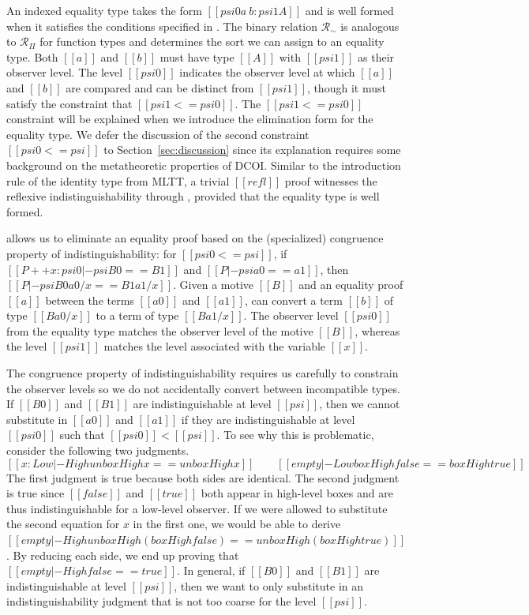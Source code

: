 \documentclass[acmsmall]{acmart}
\newcommand{\name}{DCOI\xspace}
\begin{document}
An indexed equality type takes the
form $[[psi0 a ~ b : psi1 A]]$ and is well formed when it satisfies
the conditions specified in . The binary relation
$\mathcal{R}_\sim$ is analogous to $\mathcal{R}_\Pi$ for function
types and determines the sort we can assign to an equality type.
Both $[[a]]$ and $[[b]]$
must have type $[[A]]$ with $[[psi1]]$ as their observer
level. 
The level $[[psi0]]$ indicates the observer level at which
$[[a]]$ and $[[b]]$ are compared and can be distinct from
$[[psi1]]$, though it must satisfy the constraint that $[[psi1 <=
psi0]]$. The $[[psi1 <= psi0]]$ constraint will be explained
when we introduce the elimination form for the equality type.
We defer the discussion of the second constraint $[[psi0 <=
psi]]$ to Section~\ref{sec:discussion} since its explanation requires
some background on the metatheoretic properties of \name{}.
Similar to the introduction rule of the identity type
from MLTT, a trivial $[[refl]]$ proof witnesses the reflexive
indistinguishability through , provided that the equality type is well formed.

 allows us to eliminate an equality proof based on the
(specialized) congruence property of indistinguishability:
for $[[psi0 <= psi]]$, if $[[P ++ x : psi0 |- psi B0 == B1]]$ and $[[P |-
psi a0 == a1]]$, then $[[P |- psi B0 {a0 / x} == B1 {a1 / x}]]$.
Given a motive
$[[B]]$ %
and an equality proof $[[a]]$
between the terms $[[a0]]$ and $[[a1]]$,  can convert a
term $[[b]]$ of type $[[B {a0 / x}]]$ to a term of type $[[B {a1 /
  x}]]$. The observer level $[[psi0]]$ from the equality type matches
the observer level
of the motive $[[B]]$, whereas the level $[[psi1]]$ matches the
level associated with the variable $[[x]]$.

The congruence property of indistinguishability
requires us carefully to constrain the observer levels so we do not
accidentally convert between incompatible types. If $[[B0]]$ and
$[[B1]]$ are indistinguishable at level $[[psi]]$, then we cannot
substitute in $[[a0]]$ and $[[a1]]$ if they are indistinguishable at
level $[[psi0]]$ such that $[[psi0]] < [[psi]]$. To see why this is
problematic, consider the following two judgments.
\[ [[x : Low  |- High unbox High x == unbox High x ]] \qquad
   [[empty |- Low box High false  == box High true ]] \]
The first judgment is true because both sides are identical. The
second judgment is true since $[[false]]$ and $[[true]]$ both appear in
high-level boxes and are thus indistinguishable for a low-level
observer.
If we were allowed to substitute the second equation for $x$ in the first
one, we would be able to derive $[[empty |- High unbox High (box High false) == unbox
High (box High true) ]]$. By reducing each side, we end up proving that
$[[empty |- High false == true]]$.
In general, if $[[B0]]$ and $[[B1]]$ are indistinguishable at level $[[psi]]$,
then we want to only substitute in an indistinguishability judgment that
is not too coarse for the level $[[psi]]$.
\end{document}
